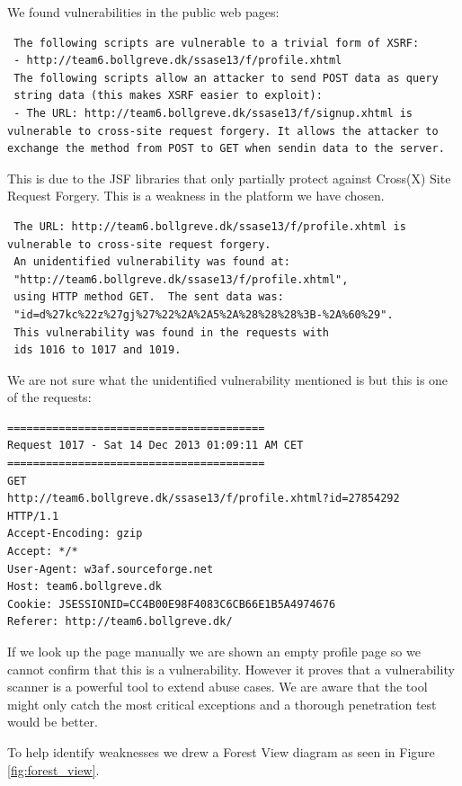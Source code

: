 \documentclass[a4paper]{article}
\begin{document}
We found vulnerabilities in the public web pages:
\begin{verbatim}
 The following scripts are vulnerable to a trivial form of XSRF:
 - http://team6.bollgreve.dk/ssase13/f/profile.xhtml
 The following scripts allow an attacker to send POST data as query 
 string data (this makes XSRF easier to exploit):
 - The URL: http://team6.bollgreve.dk/ssase13/f/signup.xhtml is 
vulnerable to cross-site request forgery. It allows the attacker to 
exchange the method from POST to GET when sendin data to the server.
\end{verbatim}
This is due to the JSF libraries that only partially protect against Cross(X) Site Request Forgery. This is a weakness in the platform we have chosen.
\begin{verbatim}
 The URL: http://team6.bollgreve.dk/ssase13/f/profile.xhtml is 
vulnerable to cross-site request forgery.
 An unidentified vulnerability was found at: 
 "http://team6.bollgreve.dk/ssase13/f/profile.xhtml", 
 using HTTP method GET.  The sent data was:
 "id=d%27kc%22z%27gj%27%22%2A%2A5%2A%28%28%28%3B-%2A%60%29". 
 This vulnerability was found in the requests with 
 ids 1016 to 1017 and 1019.
\end{verbatim}

We are not sure what the unidentified vulnerability mentioned is but this is one of the requests:
\begin{verbatim}
========================================
Request 1017 - Sat 14 Dec 2013 01:09:11 AM CET
========================================
GET 
http://team6.bollgreve.dk/ssase13/f/profile.xhtml?id=27854292 
HTTP/1.1
Accept-Encoding: gzip
Accept: */*
User-Agent: w3af.sourceforge.net
Host: team6.bollgreve.dk
Cookie: JSESSIONID=CC4B00E98F4083C6CB66E1B5A4974676
Referer: http://team6.bollgreve.dk/
\end{verbatim}

If we look up the page manually we are shown an empty profile page so we cannot confirm that this is a vulnerability. However it proves that a vulnerability scanner is a powerful tool to extend abuse cases.  We are aware that the tool might only catch the most critical exceptions and a thorough penetration test would be better.

To help identify weaknesses we drew a Forest View diagram as seen in Figure \ref{fig:forest_view}.
\end{document}
